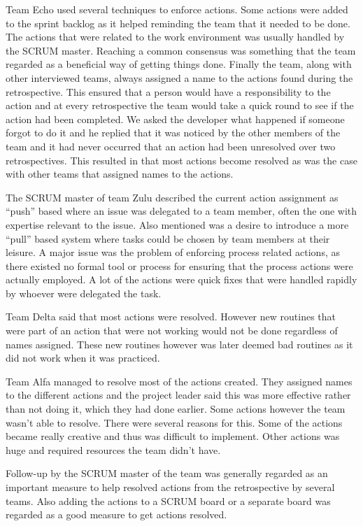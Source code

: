 Team Echo used several techniques to enforce actions. Some actions were added to the sprint backlog as it helped reminding the team that it needed to be done. The actions that were related to the work environment was usually handled by the SCRUM master. Reaching a common consensus was something that the team regarded as a beneficial way of getting things done. Finally the team, along with other interviewed teams, always assigned a name to the actions found during the retrospective. This ensured that a person would have a responsibility to the action and at every retrospective the team would take a quick round to see if the action had been completed. We asked the developer what happened if someone forgot to do it and he replied that it was noticed by the other members of the team and it had never occurred that an action had been unresolved over two retrospectives. This resulted in that most actions become resolved as was the case with other teams that assigned names to the actions. 

The SCRUM master of team Zulu described the current action assignment as ``push'' based where an issue was delegated to a team member, often the one with expertise relevant to the issue. Also mentioned was a desire to introduce a more ``pull'' based system where tasks could be chosen by team members at their leisure. A major issue was the problem of enforcing process related actions, as there existed no formal tool or process for ensuring that the process actions were actually employed. A lot of the actions were quick fixes that were handled rapidly by whoever were delegated the task.

Team Delta said that most actions were resolved. However new routines that were part of an action that were not working would not be done regardless of names assigned. These new routines however was later deemed bad routines as it did not work when it was practiced. 

Team Alfa managed to resolve most of the actions created. They assigned names to the different actions and the project leader said this was more effective rather than not doing it, which they had done earlier. Some actions however the team wasn't able to resolve. There were several reasons for this. Some of the actions became really creative and thus was difficult to implement. Other actions was huge and required resources the team didn't have. 

Follow-up by the SCRUM master of the team was generally regarded as an important measure to help resolved actions from the retrospective by several teams. Also adding the actions to a SCRUM board or a separate board was regarded as a good measure to get actions resolved. 

